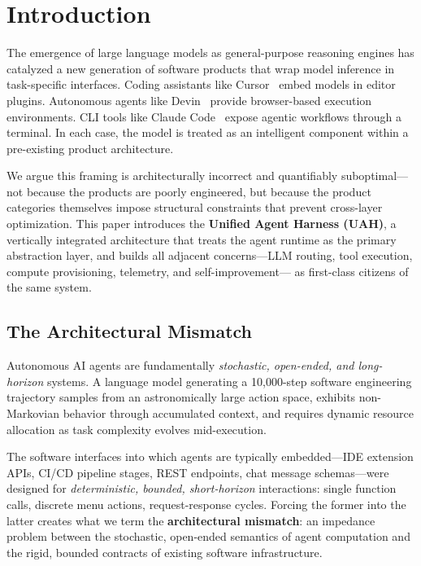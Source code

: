 \section{Introduction}

\label{sec:intro}

The emergence of large language models as general-purpose reasoning engines has
catalyzed a new generation of software products that wrap model inference in
task-specific interfaces. Coding assistants like Cursor~\cite{cursor2024} embed
models in editor plugins. Autonomous agents like
Devin~\cite{cognition2024devin} provide browser-based execution environments.
CLI tools like Claude Code~\cite{anthropic2024claude} expose agentic workflows
through a terminal. In each case, the model is treated as an intelligent
component within a pre-existing product architecture.

We argue this framing is architecturally incorrect and quantifiably
suboptimal---not because the products are poorly engineered, but because the
product categories themselves impose structural constraints that prevent
cross-layer optimization. This paper introduces the \textbf{Unified Agent
Harness (UAH)}, a vertically integrated architecture that treats the agent
runtime as the primary abstraction layer, and builds all adjacent concerns---LLM
routing, tool execution, compute provisioning, telemetry, and self-improvement---
as first-class citizens of the same system.

\subsection{The Architectural Mismatch}

Autonomous AI agents are fundamentally \emph{stochastic, open-ended, and
long-horizon} systems. A language model generating a 10,000-step software
engineering trajectory samples from an astronomically large action space,
exhibits non-Markovian behavior through accumulated context, and requires
dynamic resource allocation as task complexity evolves mid-execution.

The software interfaces into which agents are typically embedded---IDE extension
APIs, CI/CD pipeline stages, REST endpoints, chat message schemas---were
designed for \emph{deterministic, bounded, short-horizon} interactions:
single function calls, discrete menu actions, request-response cycles. Forcing
the former into the latter creates what we term the \textbf{architectural
mismatch}: an impedance problem between the stochastic, open-ended semantics of
agent computation and the rigid, bounded contracts of existing software
infrastructure.


